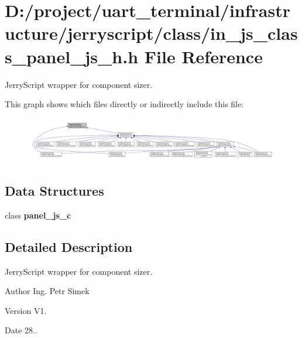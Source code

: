 \section{D\+:/project/uart\+\_\+terminal/infrastructure/jerryscript/class/in\+\_\+js\+\_\+class\+\_\+panel\+\_\+js\+\_\+h.h File Reference}
\label{in__js__class__panel__js__h_8h}


Jerry\+Script wrapper for component sizer.  


This graph shows which files directly or indirectly include this file\+:\nopagebreak
\begin{figure}[H]
\begin{center}
\leavevmode
\includegraphics[width=350pt]{in__js__class__panel__js__h_8h__dep__incl}
\end{center}
\end{figure}
\subsection*{Data Structures}
\begin{DoxyCompactItemize}
\item 
class \textbf{ panel\+\_\+js\+\_\+c}
\end{DoxyCompactItemize}


\subsection{Detailed Description}
Jerry\+Script wrapper for component sizer. 

\begin{DoxyAuthor}{Author}
Ing. Petr Simek 
\end{DoxyAuthor}
\begin{DoxyVersion}{Version}
V1. 
\end{DoxyVersion}
\begin{DoxyDate}{Date}
28.. 
\end{DoxyDate}
